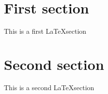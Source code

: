 \documentclass{article}
\begin{document}
\section{First section}

This is a first \LaTeX section

\section{Second section}

This is a second \LaTeX section
\end{document}
